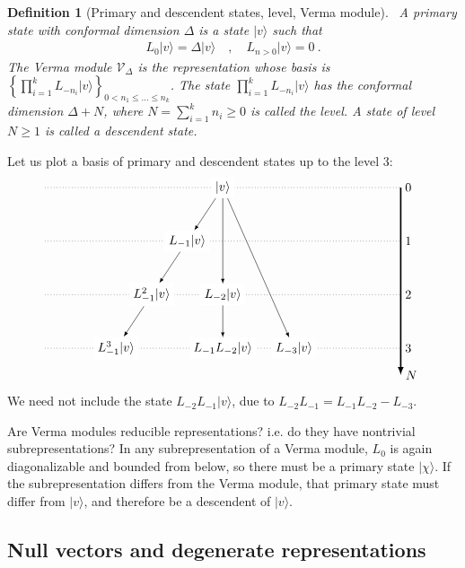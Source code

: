 \documentclass[12pt, a4paper]{article}
\theoremstyle{break}
\newtheorem{defn}[exo]{Definition}
\begin{document}
\begin{defn}[Primary and descendent states, level, Verma module]
 ~\label{def:prim}
 A primary state with conformal dimension $\Delta$ is a state $|v\rangle$ such that 
 \begin{align}
  L_0 |v\rangle = \Delta |v\rangle \quad , \quad L_{n>0} |v\rangle = 0\ .
 \end{align}
The Verma module $\mathcal V_\Delta$ is the representation whose basis is 
 $
 \left\{ \prod_{i=1}^k L_{-n_i} |v\rangle\right\}_{ 0<n_1\leq \dots \leq n_k}
 $.
The state $\prod_{i=1}^k L_{-n_i} |v\rangle $ has the conformal dimension $\Delta+N$, where $N=\sum_{i=1}^k n_i\geq 0$ is called the level. A state of level $N\geq 1$ is called a descendent state.
\end{defn}
Let us plot a basis of primary and descendent states up to the level $3$:
\begin{align}
 \begin{tikzpicture}[scale = .25, baseline=(current  bounding  box.center)]
  \draw[-latex, very thick] (20, 0) -- (20, -21) node [right] {$N$};
  \foreach \x in {0, ..., 3}
  {
  \draw [dotted] (-20, {-6*\x}) -- (20, {-6*\x}) node [right] {${\x}$};
  }
  \node[fill = white] at (0, 0) (0) {$|v\rangle$};
  \node[fill = white] at (-4,-6) (1) {$L_{-1}|v\rangle$};
  \node[fill = white] at (-8, -12) (11) {$L_{-1}^2|v\rangle$};
  \node[fill = white] at (-12, -18) (111) {$L_{-1}^3|v\rangle$};
  \node[fill = white] at (0,-12) (2) {$L_{-2}|v\rangle$};
  \node[fill = white] at (0,-18) (12) {$L_{-1}L_{-2}|v\rangle$};
  \node[fill = white] at (8,-18) (3) {$L_{-3}|v\rangle$};
  \draw[-latex] (0) -- (1);
  \draw[-latex] (1) -- (11);
  \draw[-latex] (11) -- (111);
  \draw[-latex] (0) -- (2);
  \draw[-latex] (0) -- (3);
  \draw[-latex] (2) -- (12);
 \end{tikzpicture}
\end{align}
We need not include the state $L_{-2}L_{-1}|v\rangle$, due to $L_{-2}L_{-1} = L_{-1}L_{-2} - L_{-3}$.

Are Verma modules reducible representations? i.e. do they have nontrivial subrepresentations? In any subrepresentation of a Verma module, $L_0$ is again diagonalizable and bounded from below, so there must be a primary state $|\chi\rangle$. If the subrepresentation differs from the Verma module, that primary state must differ from $|v\rangle$, and therefore be a descendent of $|v\rangle$.


\subsection{Null vectors and degenerate representations}\label{sec:nv}
\end{document}
